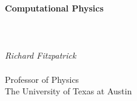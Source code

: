 \documentclass[12pt]{rfbook}
\begin{document}
\thispagestyle{empty}
\begin{center}
{\Huge\bf Computational Physics}\\[1ex]
~\\
~\\
~\\
{\Large\em  Richard Fitzpatrick}\\[1.5ex]~\\[1.5ex]
{\Large\sf  Professor  of Physics}\\[1.5ex]
{\Large\sf  The University of Texas at Austin}
\end{center}

\pagestyle{fancy}
\renewcommand{\chaptermark}[1]{\markboth{#1}{}}
\fancyhf{}
\fancyhead[LO,RE]{\sl \leftmark}
\fancyhead[LE,RO]{\sl \thepage}

\tableofcontents










\end{document}
